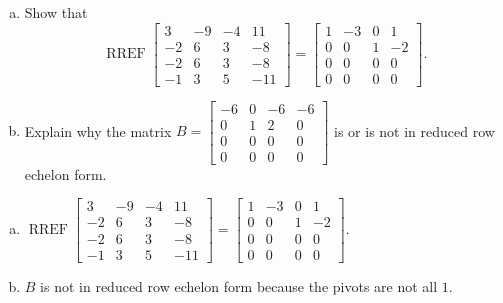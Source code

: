 
\begin{exerciseStatement}

\begin{enumerate}[(a)]
\item Show that \[\operatorname{RREF} \left[\begin{array}{cccc}
3 & -9 & -4 & 11 \\
-2 & 6 & 3 & -8 \\
-2 & 6 & 3 & -8 \\
-1 & 3 & 5 & -11
\end{array}\right] = \left[\begin{array}{cccc}
1 & -3 & 0 & 1 \\
0 & 0 & 1 & -2 \\
0 & 0 & 0 & 0 \\
0 & 0 & 0 & 0
\end{array}\right] .\]
\item Explain why the matrix \(B= \left[\begin{array}{cccc}
-6 & 0 & -6 & -6 \\
0 & 1 & 2 & 0 \\
0 & 0 & 0 & 0 \\
0 & 0 & 0 & 0
\end{array}\right] \) is or is not in reduced row echelon form.
\end{enumerate}
    
\end{exerciseStatement}
    
\begin{exerciseAnswer} 

\begin{enumerate}[(a)]
\item \(\operatorname{RREF} \left[\begin{array}{cccc}
3 & -9 & -4 & 11 \\
-2 & 6 & 3 & -8 \\
-2 & 6 & 3 & -8 \\
-1 & 3 & 5 & -11
\end{array}\right] = \left[\begin{array}{cccc}
1 & -3 & 0 & 1 \\
0 & 0 & 1 & -2 \\
0 & 0 & 0 & 0 \\
0 & 0 & 0 & 0
\end{array}\right] .\)
\item \(B\) is not in reduced row echelon form because the pivots are not all \(1\). 
\end{enumerate}
    
\end{exerciseAnswer}
    
